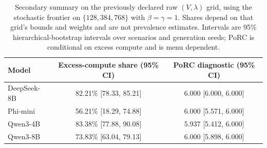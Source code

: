 \begin{table}[H]
\centering
\caption{Secondary summary on the previously declared raw $(V,\lambda)$ grid, using the stochastic frontier on $\{128,384,768\}$ with $\beta=\gamma=1$. Shares depend on that grid's bounds and weights and are not prevalence estimates. Intervals are 95\% hierarchical-bootstrap intervals over scenarios and generation seeds; PoRC is conditional on excess compute and is menu dependent.}
\label{tab:game}
\small
\setlength{\tabcolsep}{4pt}
\begin{tabular}{lcc}
\toprule
Model & Excess-compute share (95\% CI) & PoRC diagnostic (95\% CI) \\
\midrule
DeepSeek-8B & 82.21\% [78.33, 85.21] & 6.000 [6.000, 6.000] \\
Phi-mini & 56.21\% [18.29, 74.88] & 6.000 [5.571, 6.000] \\
Qwen3-4B & 83.38\% [77.88, 90.08] & 5.937 [5.412, 6.000] \\
Qwen3-8B & 73.83\% [63.04, 79.13] & 6.000 [5.898, 6.000] \\
\bottomrule
\end{tabular}
\end{table}
